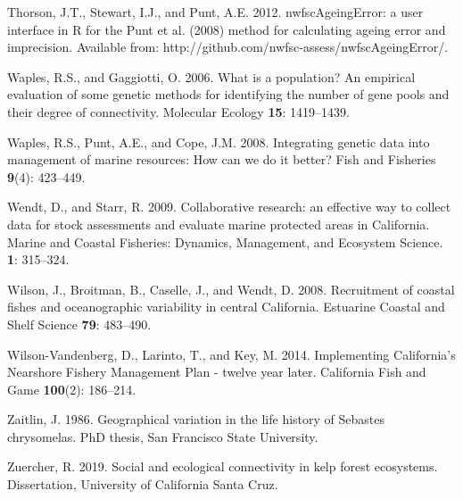 \documentclass[12pt,]{article}
\begin{document}
\hypertarget{ref-Thorson2012}{}
Thorson, J.T., Stewart, I.J., and Punt, A.E. 2012. nwfscAgeingError: a
user interface in R for the Punt et al. (2008) method for calculating
ageing error and imprecision. Available from:
http://github.com/nwfsc-assess/nwfscAgeingError/.

\hypertarget{ref-Waples2006}{}
Waples, R.S., and Gaggiotti, O. 2006. What is a population? An empirical
evaluation of some genetic methods for identifying the number of gene
pools and their degree of connectivity. Molecular Ecology \textbf{15}:
1419--1439.

\hypertarget{ref-Waples2008}{}
Waples, R.S., Punt, A.E., and Cope, J.M. 2008. Integrating genetic data
into management of marine resources: How can we do it better? Fish and
Fisheries \textbf{9}(4): 423--449.

\hypertarget{ref-Wendt2009}{}
Wendt, D., and Starr, R. 2009. Collaborative research: an effective way
to collect data for stock assessments and evaluate marine protected
areas in California. Marine and Coastal Fisheries: Dynamics, Management,
and Ecosystem Science. \textbf{1}: 315--324.

\hypertarget{ref-Wilson2008}{}
Wilson, J., Broitman, B., Caselle, J., and Wendt, D. 2008. Recruitment
of coastal fishes and oceanographic variability in central California.
Estuarine Coastal and Shelf Science \textbf{79}: 483--490.

\hypertarget{ref-Vandenberg2014}{}
Wilson-Vandenberg, D., Larinto, T., and Key, M. 2014. Implementing
California's Nearshore Fishery Management Plan - twelve year later.
California Fish and Game \textbf{100}(2): 186--214.

\hypertarget{ref-Zaitlin1986}{}
Zaitlin, J. 1986. Geographical variation in the life history of Sebastes
chrysomelas. PhD thesis, San Francisco State University.

\hypertarget{ref-Zuercher2019}{}
Zuercher, R. 2019. Social and ecological connectivity in kelp forest
ecosystems. Dissertation, University of California Santa Cruz.
\end{document}
